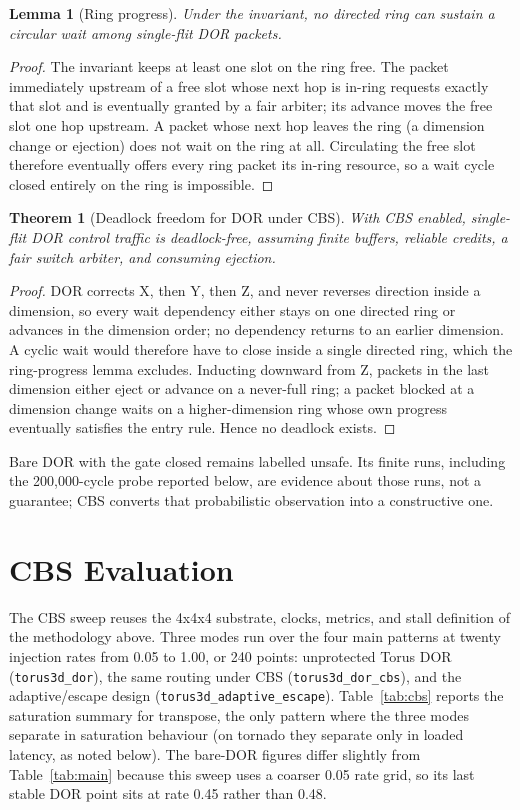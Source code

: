 \documentclass[10pt]{article}
\newtheorem{lemma}{Lemma}
\newtheorem{theorem}{Theorem}
\begin{document}
\begin{lemma}[Ring progress]
Under the invariant, no directed ring can sustain a circular wait among
single-flit DOR packets.
\end{lemma}
\begin{proof}
The invariant keeps at least one slot on the ring free. The packet
immediately upstream of a free slot whose next hop is in-ring requests
exactly that slot and is eventually granted by a fair arbiter; its advance
moves the free slot one hop upstream. A packet whose next hop leaves the
ring (a dimension change or ejection) does not wait on the ring at all.
Circulating the free slot therefore eventually offers every ring packet its
in-ring resource, so a wait cycle closed entirely on the ring is impossible.
\end{proof}

\begin{theorem}[Deadlock freedom for DOR under CBS]
With CBS enabled, single-flit DOR control traffic is deadlock-free, assuming
finite buffers, reliable credits, a fair switch arbiter, and consuming
ejection.
\end{theorem}
\begin{proof}
DOR corrects X, then Y, then Z, and never reverses direction inside a
dimension, so every wait dependency either stays on one directed ring or
advances in the dimension order; no dependency returns to an earlier
dimension. A cyclic wait would therefore have to close inside a single
directed ring, which the ring-progress lemma excludes. Inducting downward
from Z, packets in the last dimension either eject or advance on a never-full
ring; a packet blocked at a dimension change waits on a higher-dimension ring
whose own progress eventually satisfies the entry rule. Hence no deadlock
exists.
\end{proof}

Bare DOR with the gate closed remains labelled unsafe. Its finite runs,
including the 200,000-cycle probe reported below, are evidence about those
runs, not a guarantee; CBS converts that probabilistic observation into a
constructive one.

\section{CBS Evaluation}
The CBS sweep reuses the 4x4x4 substrate, clocks, metrics, and stall
definition of the methodology above. Three modes run over the four main
patterns at twenty injection rates from 0.05 to 1.00, or 240 points:
unprotected Torus DOR (\texttt{torus3d\_dor}), the same routing under CBS
(\texttt{torus3d\_dor\_cbs}), and the adaptive/escape design
(\texttt{torus3d\_adaptive\_escape}). Table~\ref{tab:cbs} reports the
saturation summary for transpose, the only pattern where the three modes
separate in saturation behaviour (on tornado they separate only in loaded
latency, as noted below). The bare-DOR figures differ slightly from Table~\ref{tab:main}
because this sweep uses a coarser 0.05 rate grid, so its last stable DOR
point sits at rate 0.45 rather than 0.48.
\end{document}

